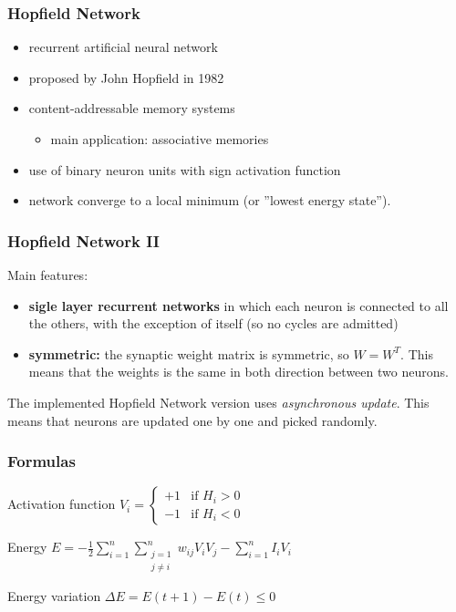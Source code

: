 \documentclass{beamer}
\begin{document}
\begin{frame}
\frametitle{Hopfield Network}
\begin{itemize}
\item recurrent artificial neural network
\item proposed by John Hopfield in 1982
\item content-addressable memory systems
\begin{itemize}
\item main application: associative memories
\end{itemize}
\item use of binary neuron units with sign activation function
\item network converge to a local minimum (or ”lowest energy state”).
\end{itemize}
\end{frame}


\begin{frame}
\frametitle{Hopfield Network II}
Main features:
\begin{itemize}
\item\textbf{sigle layer recurrent networks} in which each neuron is connected to all the others, with the exception of itself (so no cycles are admitted)
\item\textbf{symmetric:} the synaptic weight matrix is symmetric, so $W=W^T$. This means that the weights is the same in both direction between two neurons.
\end{itemize}
The implemented Hopfield Network version uses \emph{asynchronous update}. This means that neurons are updated one by one and picked randomly.
\end{frame}



\begin{frame}
\frametitle{Formulas}
\begin{block}{Activation function}
$V_i = \begin{cases}
		+1 & \text{if } H_i > 0 \\
		-1 & \text{if } H_i < 0
	\end{cases}$
\end{block}

\begin{block}{Energy}
$E = - \frac{1}{2} \sum_{i=1}^n \sum_{\substack{j=1 \\ j \neq i}}^n w_{ij} V_i V_j - \sum_{i=1}^n I_i V_i$
\end{block}
\begin{block}{Energy variation}
$\Delta E = E(t+1)-E(t)\leq 0$
\end{block}
\end{frame}
\end{document}
